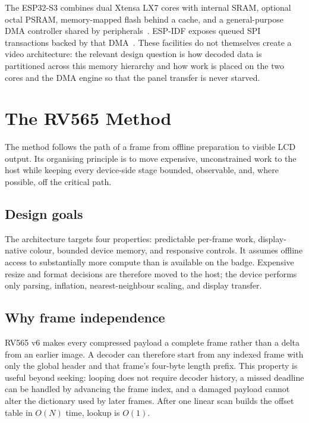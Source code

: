 \documentclass[11pt,twocolumn]{article}
\newcommand{\system}{RV565}
\begin{document}
The ESP32-S3 combines dual Xtensa LX7 cores with internal SRAM, optional
octal PSRAM, memory-mapped flash behind a cache, and a general-purpose DMA
controller shared by peripherals~\cite{espressif2023datasheet,espressif2024trm}.
ESP-IDF exposes queued SPI transactions backed by that
DMA~\cite{espressif2026spi}.  These facilities do not themselves create a
video architecture: the relevant design question is how decoded data is
partitioned across this memory hierarchy and how work is placed on the two
cores and the DMA engine so that the panel transfer is never starved.

\section{The \system{} Method}

The method follows the path of a frame from offline preparation to visible LCD
output.  Its organising principle is to move expensive, unconstrained work to
the host while keeping every device-side stage bounded, observable, and, where
possible, off the critical path.

\subsection{Design goals}

The architecture targets four properties: predictable per-frame work,
display-native colour, bounded device memory, and responsive controls.  It
assumes offline access to substantially more compute than is available on the
badge.  Expensive resize and format decisions are therefore moved to the host;
the device performs only parsing, inflation, nearest-neighbour scaling, and
display transfer.

\subsection{Why frame independence}

\system{} v6 makes every compressed payload a complete frame rather than a
delta from an earlier image.  A decoder can therefore start from any indexed
frame with only the global header and that frame's four-byte length prefix.
This property is useful beyond seeking: looping does not require decoder
history, a missed deadline can be handled by advancing the frame index, and a
damaged payload cannot alter the dictionary used by later frames.  After one
linear scan builds the offset table in $O(N)$ time, lookup is $O(1)$.
\end{document}

